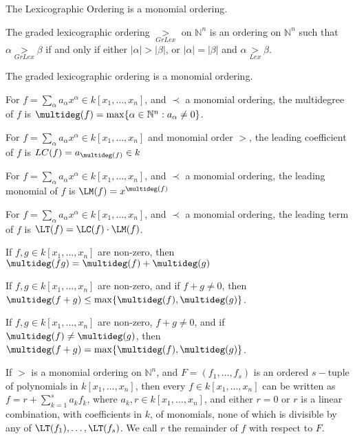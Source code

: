 \documentclass[crop=false,class=book,oneside]{standalone}
\begin{document}
\begin{theorem}
The Lexicographic Ordering is a monomial ordering.
\end{theorem}
\begin{definition}
The graded lexicographic ordering $\underset{GrLex}{>}$ on $\mathbb{N}^n$ is an ordering on $\mathbb{N}^n$ such that $\alpha \underset{GrLex}{>}\beta$ if and only if either $|\alpha|>|\beta|$, or $|\alpha| = |\beta|$ and $\alpha \underset{Lex}{>}\beta$.
\end{definition}
\begin{theorem}
The graded lexicographic ordering is a monomial ordering.
\end{theorem}
\begin{definition}
For $f=\sum_{\alpha} a_{\alpha} x^\alpha \in k[x_1,\hdots ,x_n]$, and $\prec$ a monomial ordering, the multidegree of $f$ is $\multideg(f) = \max\{\alpha\in\mathbb{N}^n: a_{\alpha} \ne 0\}$.
\end{definition}
\begin{definition}
For $f=\sum_{\alpha}a_\alpha x^\alpha \in k[x_1,\hdots ,x_n]$ and monomial order $>$, the leading coefficient of $f$ is $LC(f) =a_{\multideg(f)}\in k$
\end{definition}
\begin{definition}
For $f=\sum_{\alpha} a_{\alpha} x^\alpha \in k[x_1,\hdots ,x_n]$, and $\prec$ a monomial ordering, the leading monomial of $f$ is $\LM(f) = x^{\multideg(f)}$
\end{definition}
\begin{definition}
For $f=\sum_{\alpha} a_{\alpha} x^{\alpha} \in k[x_1,\hdots ,x_n]$, and $\prec$ a monomial ordering, the leading term of $f$ is $\LT(f) = \LC(f)\cdot \LM(f)$.
\end{definition}
\begin{theorem}
If $f,g\in k[x_1,\hdots ,x_n]$ are non-zero, then $\multideg(fg)=\multideg(f)+\multideg(g)$
\end{theorem}
\begin{theorem}
If $f,g\in k[x_1,\hdots ,x_n]$ are non-zero, and if $f+g \ne 0$, then $\multideg(f+g) \leq \max\{\multideg(f),\multideg(g)\}$.
\end{theorem}
\begin{theorem}
If $f,g\in k[x_1,\hdots ,x_n]$ are non-zero, $f+g\ne 0$, and if $\multideg(f)\ne \multideg(g)$, then $\multideg(f+g) = \max\{\multideg(f),\multideg(g)\}$.
\end{theorem}
\begin{theorem}
If $>$ is a monomial ordering on $\mathbb{N}^n$, and $F = (f_1,\hdots, f_s)$ is an ordered $s-$tuple of polynomials in $k[x_1,\hdots ,x_n]$, then every $f\in k[x_1,\hdots ,x_n]$ can be written as $f = r+\sum_{k=1}^{s} a_k f_k$, where $a_k,r\in k[x_1,\hdots ,x_n]$, and either $r=0$ or $r$ is a linear combination, with coefficients in $k$, of monomials, none of which is divisible by any of $\LT(f_1),\hdots, \LT(f_s)$. We call $r$ the remainder of $f$ with respect to $F$.
\end{theorem}
\end{document}
